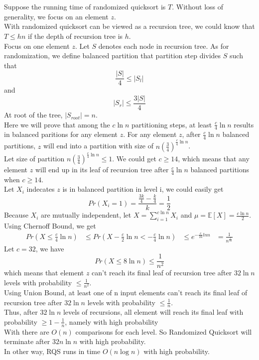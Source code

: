 \documentclass{article}
\begin{document}
	    
	\section{}
	Suppose the running time of randomized quicksort is $T$.
	Without loss of generality, we focus on an element $z$.\\
	With randomized quicksort can be viewed as a recursion tree, we could know that $T \leq hn$ if the depth of recursion tree is $h$.\\
	Focus on one element $z$.
	Let $S$ denotes each node in recursion tree.
	As for randomization, we define balanced partition that partition step divides $S$ such that 
	$$\frac{|S|}{4} \leq |S_{l}|$$
	and
	$$|S_r| \leq \frac{3|S|}{4}$$
	At root of the tree, $|S_{root}|=n$.\\
	Here we will prove that among the $c\ln{n}$ partitioning steps, at least $\frac{c}{4}\ln{n}$ results in balanced paritions for any element $z$.
	For any element $z$, after $\frac{c}{4}\ln{n}$ balanced partitions, $z$ will end into a partition with size of $n(\frac{3}{4})^{\frac{c}{4}\ln{n}}$.\\
	Let size of partition $n(\frac{3}{4})^{\frac{c}{4}\ln{n}} \leq 1$.
	We could get $c \geq 14$, which means that any element $z$ will end up in its leaf of recursion tree after $\frac{c}{4}\ln{n}$ balanced partitions when $c \geq 14$.\\
	Let $X_i$ indecates $z$ is in balanced partition in level i, we could easily get
	$$Pr(X_i=1) = \frac{\frac{3k}{4} - \frac{k}{4}}{k} = \frac{1}{2}$$
	Because $X_i$ are mutually independent, let $X=\sum_{i=1}^{c\ln{n}}X_i$ and $\mu=\mathbb{E}[X]=\frac{c\ln{n}}{2}$. Using Chernoff Bound, we get
	$$
	\begin{aligned}
	Pr(X \leq \frac{c}{4}\ln{n}) &\leq Pr(X-\frac{c}{2}\ln{n}<-\frac{c}{4}\ln{n}) 
	&\leq e^{-\frac{c}{16}{ln{n}}}
	&=\frac{1}{n^\frac{c}{16}}
	\end{aligned}
	$$
	Let $c=32$, we have 
	$$Pr(X \leq 8\ln{n}) \leq \frac{1}{n^2}$$
	which means that element $z$ can't reach its final leaf of recursion tree after $32\ln{n}$ levels with probability $\leq \frac{1}{n^2}$.\\
	Using Union Bound, at least one of n input elements can't reach its final leaf of recursion tree after $32\ln{n}$ levels with probability $\leq \frac{1}{n}$.\\
	Thus, after $32\ln{n}$ levels of recursions, all element will reach its final leaf with probability $\geq 1- \frac{1}{n}$, namely with high probability\\
	With there are $O(n)$ comparisons for each level.
	So Randomized Quicksort will terminate after $32n\ln{n}$ with high probability.\\
	In other way, RQS runs in time $O(n\log{n})$ with high probability.
\end{document}
